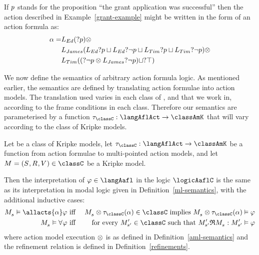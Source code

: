 \begin{example}\label{grant-example-formula}
If $p$ stands for the proposition ``the grant application was successful'' then the action described in Example~\ref{grant-example} might be written in the form of an action formula as:
\begin{align*}
    \alpha = &L_{Ed} (?{p}) \otimes\\
    &L_{James} (L_{Ed} ?{p} \sqcup L_{Ed} ?{\neg p} \sqcup L_{Tim} ?{p} \sqcup L_{Tim} ?{\neg p}) \otimes\\
    &L_{Tim} ((?{\neg p} \otimes L_{James} ?{\neg p}) \sqcup ?{\top})
\end{align*}
\end{example}

We now define the semantics of arbitrary action formula logic.
As mentioned earlier, the semantics are defined by translating action formulae into action models.
The translation used varies in each class of \classK{}, \classKFF{} and \classS{} that we work in, according to the frame conditions in each class.
Therefore our semantics are parameterised by a function $\tau_\classC: \langAflAct \to \classAmK$ that will vary according to the class of Kripke models.

\begin{definition}
Let \classC{} be a class of Kripke models, let $\tau_\classC : \langAflAct \to \classAmK$ be a function from action formulae to multi-pointed action models, and let $\kModel = \kModelTuple \in \classC$ be a Kripke model.

Then the interpretation of $\phi \in \langAafl$ in the logic $\logicAaflC$ is the same as its interpretation in modal logic given in Definition~\ref{ml-semantics}, with the additional inductive cases:
\begin{eqnarray*}
    \kPModel{\kStateS} \entails \allacts{\alpha} \phi &\text{ iff }& \kPModel{\kStateS} \exec \tau_\classC(\alpha) \in \classC \text{ implies } \kPModel{\kStateS} \exec \tau_\classC(\alpha) \entails \phi\\
    \kPModel{\kStateS} \entails \allrefs \phi &\text{ iff }& \text{for every } \kPModelP{\kStateSP} \in \classC \text{ such that } \kPModelP{\kStateSP} \refinement \kPModel{\kStateS}: \kPModelP{\kStateSP} \entails \phi
\end{eqnarray*}
where action model execution $\otimes$ is as defined in Definition~\ref{aml-semantics} and the refinement relation is defined in Definition~\ref{refinements}.
\end{definition}

